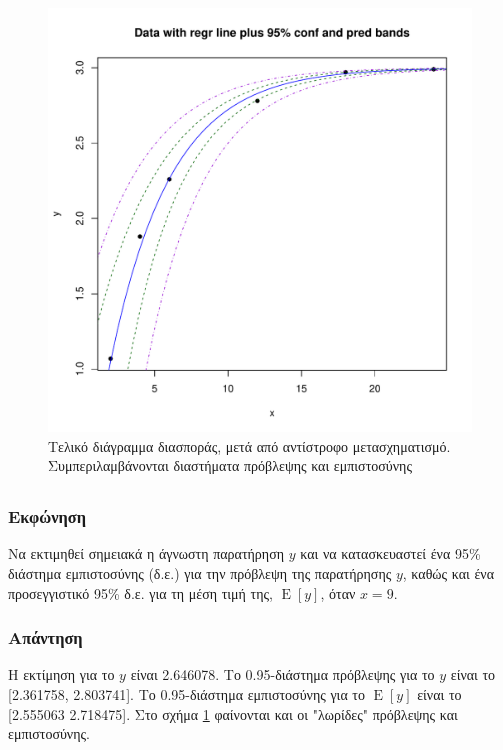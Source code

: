 \documentclass{article}
\DeclareMathOperator{\E}{\mathrm{E}}
\begin{document}
\begin{figure}[h]
    \centering
    \includegraphics[width=1.0\textwidth]{part-c-scatter-transformed-detransformed.pdf}
    \caption{Τελικό διάγραμμα διασποράς, μετά από αντίστροφο μετασχηματισμό. Συμπεριλαμβάνονται διαστήματα πρόβλεψης και εμπιστοσύνης}
    \label{fig:part-c-scatter-transformed-detransformed}
\end{figure}


\subsection{}
\subsubsection*{Εκφώνηση}
Να εκτιμηθεί σημειακά η άγνωστη παρατήρηση \(y\) και να κατασκευαστεί ένα
95\% διάστημα εμπιστοσύνης (δ.ε.) για την πρόβλεψη της παρατήρησης \(y\),
καθώς και ένα προσεγγιστικό 95\% δ.ε. για τη μέση τιμή της, \(\E[y]\), όταν \(x = 9\).
\subsubsection*{Απάντηση}
Η εκτίμηση για το \(y\) είναι 2.646078.
Το 0.95-διάστημα πρόβλεψης για το \(y\) είναι το [2.361758, 2.803741].
Το 0.95-διάστημα εμπιστοσύνης για το \(\E[y]\) είναι το [2.555063 2.718475].
Στο σχήμα \ref{fig:part-c-scatter-transformed-detransformed} φαίνονται και οι "λωρίδες" πρόβλεψης και εμπιστοσύνης.
\end{document}
